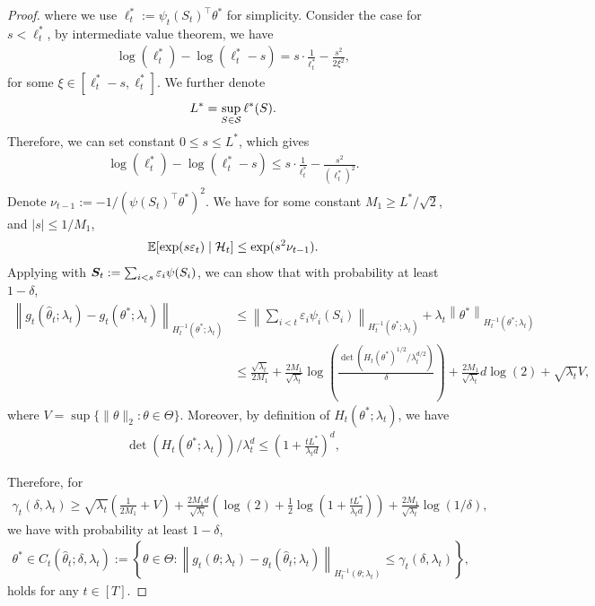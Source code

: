\begin{lemma}
\begin{proof}
where we use $\ell_t^* := \psi_t(S_t)^\top\theta^*$ for simplicity. Consider the case for $s < \ell_t^*$, by intermediate value theorem, we have
\begin{align*}
    \log(\ell_t^*) - \log(\ell_t^* - s) = s \cdot \frac{1}{\ell_t^*} - \frac{s^2}{2\xi^2},
\end{align*}
for some $\xi \in [\ell_t^* - s, \ell_t^*]$. We further denote
\begin{equation}\label{eq:def-Lstar}
    L^* = \sup_{S \in {\mathcal{S}}} \ell^*(S).
\end{equation}
Therefore, we can set constant $0 \le s \le L^*$, which gives
\begin{align*}
    \log(\ell_t^*) - \log(\ell_t^* - s) \leq s \cdot \frac{1}{\ell_t^*} - \frac{s^2}{(\ell_t^*)^2}.
\end{align*}
Denote $\nu_{t-1} := -1/{(\psi(S_t)^\top \theta^*)^2}$. We have for some constant $M_1 \ge L^*/\sqrt{2}$, and $|s| \le 1/M_1$,
\begin{align*}
    \mathbb{E}[\exp(s\varepsilon_t) \mid {\mathcal{H}}_t] \le \exp(s^2 \nu_{t-1}).
\end{align*}
Applying \citet[Theorem 2]{janz2024exploration} with ${\bm{S}}_t := \sum_{i<s} \varepsilon_i \psi(S_i)$, we can show that with probability at least $1 - \delta$,
\begin{align*}
    \left\|g_t(\hat\theta_t; \lambda_t) - g_t(\theta^*; \lambda_t)\right\|_{H_t^{-1}(\theta^*;\lambda_t)} &\le \left\|\sum_{i<t}\varepsilon_i \psi_i(S_i)\right\|_{H_t^{-1}(\theta^*;\lambda_t)} + \lambda_t \left\|\theta^*\right\|_{H_t^{-1}(\theta^*;\lambda_t)} \\
    &\le \frac{\sqrt{\lambda_t}}{2M_1} + \frac{2M_1}{\sqrt{\lambda_t}}\log\left(\frac{\det(H_t(\theta^*)^{1/2}/\lambda_t^{d/2})}{\delta}\right) + \frac{2M_1}{\sqrt{\lambda_t}}d\log(2) + \sqrt{\lambda_t} V,
\end{align*}
where $V = \sup\{\|\theta\|_2 : \theta \in \Theta\}$. Moreover, by definition of $H_t(\theta^*; \lambda_t)$, we have
\begin{align*}
    \det(H_t(\theta^*; \lambda_t))/\lambda_t^d \le \left(1 + \frac{tL^*}{\lambda_t d}\right)^d,
\end{align*}

Therefore, for
\begin{align*}
    \gamma_t(\delta, \lambda_t) \ge \sqrt{\lambda_t}\left(\frac{1}{2M_1} + V\right) + \frac{2M_1d}{\sqrt{\lambda_t}}\left(\log(2) + \frac{1}{2}\log\left(1 + \frac{tL^*}{\lambda_t d}\right)\right) + \frac{2M_1}{\sqrt{\lambda_t}}\log(1/\delta),
\end{align*}
we have with probability at least $1 - \delta$, 
\begin{align*}
    \theta^* \in C_t(\hat\theta_t; \delta,\lambda_t) := \left\{ \theta \in \Theta : \left\| g_t(\theta; \lambda_t) - g_t(\hat\theta_t; \lambda_t) \right\|_{H_t^{-1}(\theta; \lambda_t)} \le \gamma_t(\delta, \lambda_t) \right\},
\end{align*}
holds for any $t \in [T]$.
\end{proof}
\end{lemma}


